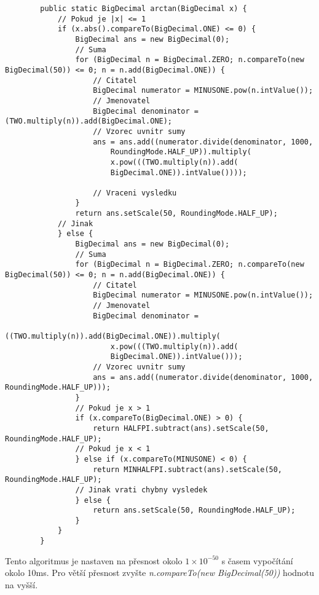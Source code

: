 \documentclass{article}
\begin{document}
    \begin{lstlisting}
        public static BigDecimal arctan(BigDecimal x) {
            // Pokud je |x| <= 1
            if (x.abs().compareTo(BigDecimal.ONE) <= 0) {
                BigDecimal ans = new BigDecimal(0);
                // Suma
                for (BigDecimal n = BigDecimal.ZERO; n.compareTo(new BigDecimal(50)) <= 0; n = n.add(BigDecimal.ONE)) {
                    // Citatel
                    BigDecimal numerator = MINUSONE.pow(n.intValue());
                    // Jmenovatel
                    BigDecimal denominator = (TWO.multiply(n)).add(BigDecimal.ONE);
                    // Vzorec uvnitr sumy
                    ans = ans.add((numerator.divide(denominator, 1000, 
                        RoundingMode.HALF_UP)).multiply(
                        x.pow(((TWO.multiply(n)).add(
                        BigDecimal.ONE)).intValue())));

                    // Vraceni vysledku
                }
                return ans.setScale(50, RoundingMode.HALF_UP);
            // Jinak
            } else {
                BigDecimal ans = new BigDecimal(0);
                // Suma
                for (BigDecimal n = BigDecimal.ZERO; n.compareTo(new BigDecimal(50)) <= 0; n = n.add(BigDecimal.ONE)) {
                    // Citatel
                    BigDecimal numerator = MINUSONE.pow(n.intValue());
                    // Jmenovatel
                    BigDecimal denominator = 
                        ((TWO.multiply(n)).add(BigDecimal.ONE)).multiply(
                        x.pow(((TWO.multiply(n)).add(
                        BigDecimal.ONE)).intValue()));
                    // Vzorec uvnitr sumy
                    ans = ans.add((numerator.divide(denominator, 1000, RoundingMode.HALF_UP)));
                }
                // Pokud je x > 1
                if (x.compareTo(BigDecimal.ONE) > 0) {
                    return HALFPI.subtract(ans).setScale(50, RoundingMode.HALF_UP);
                // Pokud je x < 1
                } else if (x.compareTo(MINUSONE) < 0) {
                    return MINHALFPI.subtract(ans).setScale(50, RoundingMode.HALF_UP);
                // Jinak vrati chybny vysledek
                } else {
                    return ans.setScale(50, RoundingMode.HALF_UP);
                }
            }
        }
    \end{lstlisting}
    Tento algoritmus je nastaven na přesnost okolo $1\times{10^{-50}}$ s časem vypočítání okolo 10ms. Pro
    větší přesnost zvyšte \textit{n.compareTo(new BigDecimal(50))} hodnotu na vyšší.
\end{document}
